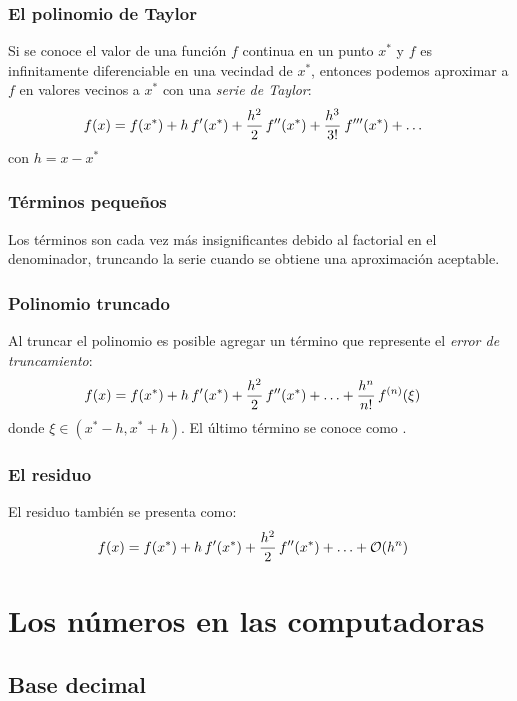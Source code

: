 \documentclass[12pt]{beamer}
\begin{document}
\begin{frame}
\frametitle{El polinomio de Taylor}
Si se conoce el valor de una función $f$ continua en un punto $x^{*}$ y $f$ es infinitamente diferenciable en una vecindad de $x^{*}$, \pause entonces podemos aproximar a $f$ en valores vecinos a $x^{*}$ con una \emph{serie de Taylor}:
\pause
\begin{align*}
f (x) = f (x^{*}) + h \, {f}^{\prime} (x^{*}) &+ \dfrac{h^{2}}{2} \, {f}^{\prime \prime} (x^{*}) + \dfrac{h^{3}}{3!} \: {f}^{\prime \prime \prime} (x^{*}) + \ldots
\end{align*}
con $h = x - x^{*}$
\end{frame}
\begin{frame}
\frametitle{Términos pequeños}
Los términos son cada vez más insignificantes debido al factorial en el denominador, \pause truncando la serie cuando se obtiene una aproximación aceptable.
\end{frame}
\begin{frame}
\frametitle{Polinomio truncado}
Al truncar el polinomio es posible agregar un término que represente el \emph{error de truncamiento}:
\pause
\begin{align*}
f (x) = f (x^{*}) + h \, {f}^{\prime} (x^{*}) &+ \dfrac{h^{2}}{2} \, {f}^{\prime \prime} (x^{*}) +  \ldots + \dfrac{h^{n}}{n!} \, {f}^{(n)} (\xi)
\end{align*}
donde $\xi \in (x^{*} - h, x^{*} + h)$. \pause El último término se conoce como .
\end{frame}
\begin{frame}
\frametitle{El residuo}
El residuo también se presenta como:
\pause
\begin{align*}
f (x) = f (x^{*}) + h \, \pderivada{f} (x^{*}) &+ \dfrac{h^{2}}{2} \, \sderivada{f} (x^{*}) +  \ldots + \order{h^{n}}
\end{align*}	
\end{frame}

\section{Los números en las computadoras}
\subsection{Base decimal}
\end{document}
